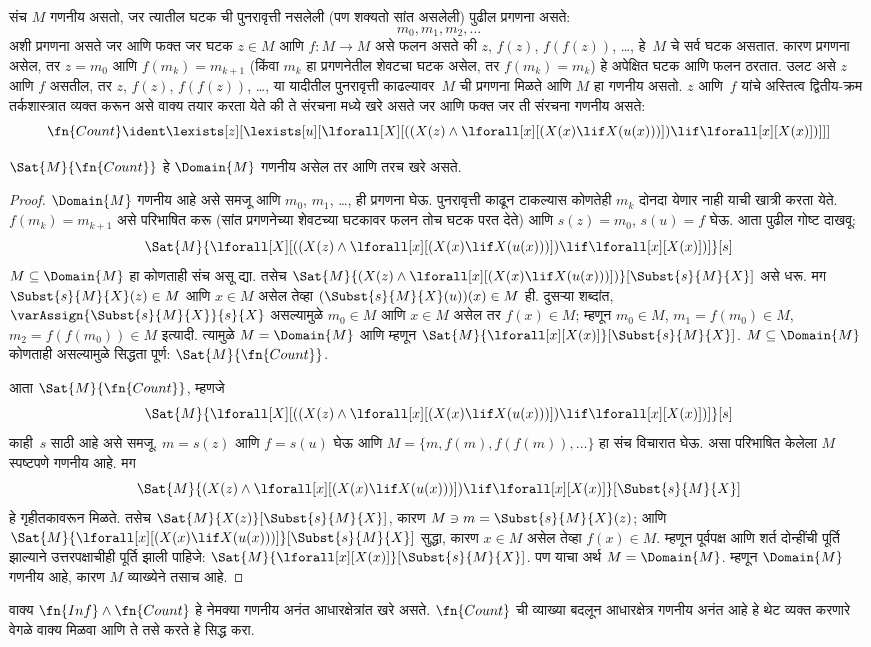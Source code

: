 संच $M$
गणनीय
असतो, जर
त्यातील
घटक
ची पुनरावृत्ती
नसलेली
(पण शक्यतो
सांत असलेली)
पुढील
प्रगणना असते:
\[m_0, m_1, m_2, \dots
\]
अशी प्रगणना
असते जर
आणि फक्त
जर
घटक
$z \in M$
आणि
$f\colon M \to M$
असे फलन
असते की
$z$, $f(z)$,
$f(f(z))$, \dots,
हे~$M$
चे सर्व
घटक
असतात.
कारण प्रगणना
असेल, तर
$z = m_0$
आणि
$f(m_k) = m_{k+1}$
(किंवा
$m_k$ हा
प्रगणनेतील
शेवटचा
घटक
असेल, तर
$f(m_k) = m_k$)
हे अपेक्षित
घटक
आणि फलन
ठरतात.
उलट असे
$z$ आणि
$f$ असतील,
तर
$z$, $f(z)$,
$f(f(z))$, \dots,
या यादीतील पुनरावृत्ती
काढल्यावर~$M$ ची प्रगणना
मिळते आणि
$M$ हा
गणनीय
असतो.
$z$ आणि~$f$
यांचे अस्तित्व
द्वितीय-क्रम
तर्कशास्त्रात
व्यक्त करून
असे
वाक्य
तयार करता
येते की
ते
संरचना
मध्ये खरे
असते जर
आणि फक्त
जर ती
संरचना
गणनीय
असते:
\[\fn{Count} \ident
\lexists[z][\lexists[u][\lforall[X][((X(z) \land
      \lforall[x][(X(x) \lif X(u(x)))]) \lif \lforall[x][X(x)])]]]
\]

\begin{prop}
$\Sat{M}{\fn{Count}}$
हे
$\Domain{M}$
गणनीय
असेल तर
आणि तरच
खरे असते.
\end{prop}

\begin{proof}
$\Domain{M}$
गणनीय
आहे असे
समजू आणि
$m_0$, $m_1$,
\dots, ही
प्रगणना घेऊ.
पुनरावृत्ती
काढून टाकल्यास
कोणतेही
$m_k$ दोनदा
येणार नाही
याची खात्री
करता येते.
$f(m_k) = m_{k+1}$
असे परिभाषित
करू (सांत
प्रगणनेच्या
शेवटच्या घटकावर
फलन तोच घटक
परत देते)
आणि
$s(z) = m_0$,
$s(u) = f$
घेऊ.
आता पुढील
गोष्ट दाखवू:
\[\Sat{M}{\lforall[X][((X(z) \land \lforall[x][(X(x) \lif X(u(x)))])
    \lif \lforall[x][X(x)])]}[s]
\]
$M \subseteq \Domain{M}$
हा कोणताही
संच असू
द्या.
तसेच
$\Sat{M}{(X(z) \land \lforall[x][(X(x) \lif
X(u(x)))])}[\Subst{s}{M}{X}]$
असे धरू.
मग
$\Subst{s}{M}{X}(z) \in M$
आणि
$x \in M$
असेल तेव्हा
$(\Subst{s}{M}{X}(u))(x) \in M$
ही.
दुसऱ्या
शब्दांत,
$\varAssign{\Subst{s}{M}{X}}{s}{X}$
असल्यामुळे
$m_0 \in M$
आणि
$x \in M$
असेल तर
$f(x) \in M$;
म्हणून
$m_0 \in M$,
$m_1 = f(m_0) \in M$,
$m_2 = f(f(m_0)) \in M$
इत्यादी.
त्यामुळे
$M = \Domain{M}$
आणि म्हणून
$\Sat{M}{\lforall[x][X(x)]}[\Subst{s}{M}{X}]$.
$M \subseteq
\Domain{M}$
कोणताही
असल्यामुळे
सिद्धता पूर्ण:
$\Sat{M}{\fn{Count}}$.

आता
$\Sat{M}{\fn{Count}}$,
म्हणजे
\[\Sat{M}{\lforall[X][((X(z) \land \lforall[x][(X(x) \lif X(u(x)))])
    \lif \lforall[x][X(x)])]}[s]
\]
काही~$s$
साठी आहे
असे समजू.
$m = s(z)$
आणि
$f = s(u)$
घेऊ आणि
$M = \{m,
f(m), f(f(m)), \dots\}$
हा संच
विचारात
घेऊ.
असा
परिभाषित
केलेला
$M$
स्पष्टपणे
गणनीय
आहे.
मग
\[\Sat{M}{(X(z) \land \lforall[x][(X(x) \lif X(u(x)))])
    \lif \lforall[x][X(x)]}[\Subst{s}{M}{X}]
\]
हे गृहीतकावरून
मिळते.
तसेच
$\Sat{M}{X(z)}[\Subst{s}{M}{X}]$,
कारण
$M \ni m =
\Subst{s}{M}{X}(z)$;
आणि
$\Sat{M}{\lforall[x][(X(x) \lif
X(u(x)))]}[\Subst{s}{M}{X}]$
सुद्धा,
कारण
$x \in M$
असेल तेव्हा
$f(x) \in
M$.
म्हणून
पूर्वपक्ष
आणि शर्त
दोन्हींची
पूर्ति
झाल्याने
उत्तरपक्षाचीही
पूर्ति झाली
पाहिजे:
$\Sat{M}{\lforall[x][X(x)]}[\Subst{s}{M}{X}]$.
पण याचा
अर्थ
$M = \Domain{M}$.
म्हणून
$\Domain{M}$
गणनीय
आहे, कारण
$M$ व्याख्येने
तसाच आहे.
\end{proof}

\begin{prob}
वाक्य
$\fn{Inf} \land \fn{Count}$
हे नेमक्या
गणनीय अनंत
आधारक्षेत्रांत
खरे असते.
$\fn{Count}$
ची व्याख्या
बदलून
आधारक्षेत्र
गणनीय अनंत
आहे हे
थेट व्यक्त
करणारे
वेगळे
वाक्य
मिळवा आणि
ते तसे
करते हे
सिद्ध करा.
\end{prob}



